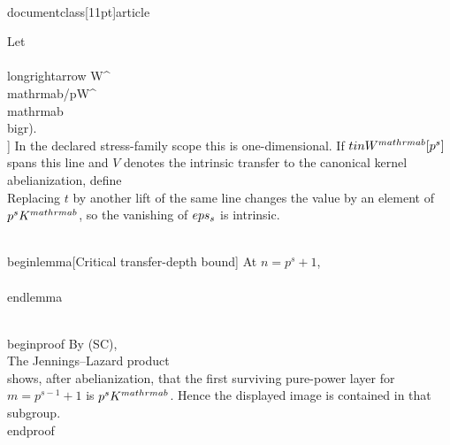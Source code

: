 \\documentclass[11pt]{article}
\begin{document}
Let
\\[
S_s(W)=\\operatorname{im}\\bigl(W^{\\mathrm{ab}}[p^s]
\\longrightarrow W^{\\mathrm{ab}}/pW^{\\mathrm{ab}}\\bigr).
\\]
In the declared stress-family scope this is one-dimensional. If $t\\in W^{\\mathrm{ab}}[p^s]$ spans this line and $V$ denotes the intrinsic transfer to the canonical kernel abelianization, define
\\[
\\eps_s(W)=p^{s-1}V(t)\\pmod{p^sK^{\\mathrm{ab}}}.
\\tag{T}
\\]
Replacing $t$ by another lift of the same line changes the value by an element of $p^sK^{\\mathrm{ab}}$, so the vanishing of $\\eps_s$ is intrinsic.

\\begin{lemma}[Critical transfer-depth bound]
At $n=p^s+1$,
\\[
\\operatorname{im}\\bigl(D_{p^s+1}(G)\\cap K
\\to K^{\\mathrm{ab}}\\bigr)
\\subseteq p^sK^{\\mathrm{ab}}.
\\tag{TF_s}
\\]
\\end{lemma}

\\begin{proof}
By (SC),
\\[
D_{p^s+1}(G)\\cap K
\\subseteq D_{p^{s-1}+1}(K).
\\]
The Jennings--Lazard product
\\[
D_m(K)=\\prod_{ip^j\\ge m}\\gamma_i(K)^{p^j}
\\]
shows, after abelianization, that the first surviving pure-power layer for
$m=p^{s-1}+1$ is $p^sK^{\\mathrm{ab}}$. Hence the displayed image is contained in that subgroup.
\\end{proof}
\end{document}
